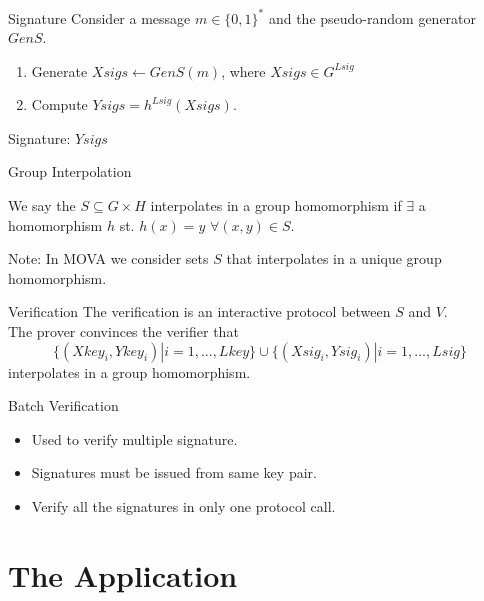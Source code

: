 \documentclass{beamer}
\newlength{\wideitemsep}
\let\olditem\item
\renewcommand{\item}{\setlength{\itemsep}{\wideitemsep}\olditem}
\begin{document}
\begin{frame}{Signature}
    Consider a message $m\in\{0,1\}^*$ and the pseudo-random generator $GenS$.
    \vspace{0.5cm}
    \begin{enumerate}
        \pause \item Generate $Xsigs \leftarrow GenS(m)$, where $Xsigs \in G^{Lsig}$ 
        \item Compute $Ysigs = h^{Lsig}(Xsigs)$.
    \end{enumerate}
    \vspace{0.5cm}
    \pause Signature: $Ysigs$
\end{frame}

\begin{frame}{Group Interpolation}
    \begin{definition}
        We say the $S \subseteq G\times H$ interpolates in a group homomorphism if $\exists$ a homomorphism $h$ st.
        $h(x) = y$ $\forall (x,y) \in S$.
    \end{definition}

    Note: In MOVA we consider sets $S$ that interpolates in a unique group homomorphism.
\end{frame}

\begin{frame}{Verification}
    The verification is an interactive protocol between $S$ and $V$.\\
    \vspace{1cm}
    \pause The prover convinces the verifier that 
        \[\{(Xkey_i,Ykey_i)| i=1,...,Lkey\} \cup \{(Xsig_i,Ysig_i)|i=1,...,Lsig\}\]
    interpolates in a group homomorphism.
\end{frame}

\begin{frame}{Batch Verification}
    \begin{itemize}
        \pause \item Used to verify multiple signature.
        \pause \item Signatures must be issued from same key pair.
        \pause \item Verify all the signatures in only one protocol call.
    \end{itemize}
\end{frame}

\section{The Application}
\end{document}
